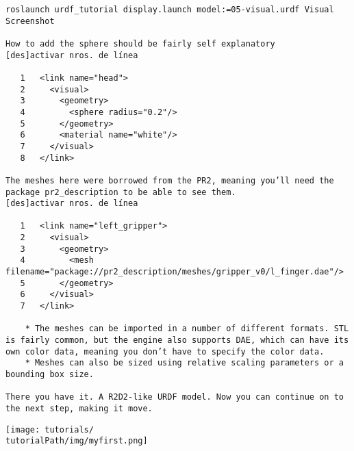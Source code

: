 \begin{verbatim}
roslaunch urdf_tutorial display.launch model:=05-visual.urdf Visual Screenshot

How to add the sphere should be fairly self explanatory
[des]activar nros. de línea

   1   <link name="head">
   2     <visual>
   3       <geometry>
   4         <sphere radius="0.2"/>
   5       </geometry>
   6       <material name="white"/>
   7     </visual>
   8   </link>

The meshes here were borrowed from the PR2, meaning you’ll need the package pr2_description to be able to see them.
[des]activar nros. de línea

   1   <link name="left_gripper">
   2     <visual>
   3       <geometry>
   4         <mesh filename="package://pr2_description/meshes/gripper_v0/l_finger.dae"/>
   5       </geometry>
   6     </visual>
   7   </link>

    * The meshes can be imported in a number of different formats. STL is fairly common, but the engine also supports DAE, which can have its own color data, meaning you don’t have to specify the color data.
    * Meshes can also be sized using relative scaling parameters or a bounding box size. 

There you have it. A R2D2-like URDF model. Now you can continue on to the next step, making it move. 
\end{verbatim}


\texttt{[image: tutorials/\\tutorialPath/img/myfirst.png]}	

